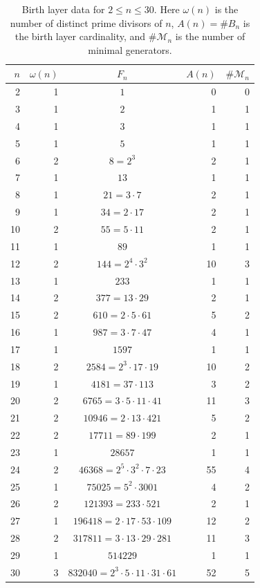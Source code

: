 \begin{table}[ht]
\centering
\small
\caption{Birth layer data for $2 \le n \le 30$. Here $\omega(n)$ is the number of distinct prime divisors of $n$, $A(n)=\#B_n$ is the birth layer cardinality, and $\#\mathcal{M}_n$ is the number of minimal generators.}
\label{tab:birth-layer-data}
\begin{tabular}{rrcrr}
\toprule
$n$ & $\omega(n)$ & $F_n$ & $A(n)$ & $\#\mathcal{M}_n$ \\
\midrule
  2 & 1 & $1$ & 0 & 0 \\
  3 & 1 & $2$ & 1 & 1 \\
  4 & 1 & $3$ & 1 & 1 \\
  5 & 1 & $5$ & 1 & 1 \\
  6 & 2 & $8 = 2^{3}$ & 2 & 1 \\
  7 & 1 & $13$ & 1 & 1 \\
  8 & 1 & $21 = 3 \cdot 7$ & 2 & 1 \\
  9 & 1 & $34 = 2 \cdot 17$ & 2 & 1 \\
  10 & 2 & $55 = 5 \cdot 11$ & 2 & 1 \\
  11 & 1 & $89$ & 1 & 1 \\
  12 & 2 & $144 = 2^{4} \cdot 3^{2}$ & 10 & 3 \\
  13 & 1 & $233$ & 1 & 1 \\
  14 & 2 & $377 = 13 \cdot 29$ & 2 & 1 \\
  15 & 2 & $610 = 2 \cdot 5 \cdot 61$ & 5 & 2 \\
  16 & 1 & $987 = 3 \cdot 7 \cdot 47$ & 4 & 1 \\
  17 & 1 & $1597$ & 1 & 1 \\
  18 & 2 & $2584 = 2^{3} \cdot 17 \cdot 19$ & 10 & 2 \\
  19 & 1 & $4181 = 37 \cdot 113$ & 3 & 2 \\
  20 & 2 & $6765 = 3 \cdot 5 \cdot 11 \cdot 41$ & 11 & 3 \\
  21 & 2 & $10946 = 2 \cdot 13 \cdot 421$ & 5 & 2 \\
  22 & 2 & $17711 = 89 \cdot 199$ & 2 & 1 \\
  23 & 1 & $28657$ & 1 & 1 \\
  24 & 2 & $46368 = 2^{5} \cdot 3^{2} \cdot 7 \cdot 23$ & 55 & 4 \\
  25 & 1 & $75025 = 5^{2} \cdot 3001$ & 4 & 2 \\
  26 & 2 & $121393 = 233 \cdot 521$ & 2 & 1 \\
  27 & 1 & $196418 = 2 \cdot 17 \cdot 53 \cdot 109$ & 12 & 2 \\
  28 & 2 & $317811 = 3 \cdot 13 \cdot 29 \cdot 281$ & 11 & 3 \\
  29 & 1 & $514229$ & 1 & 1 \\
  30 & 3 & $832040 = 2^{3} \cdot 5 \cdot 11 \cdot 31 \cdot 61$ & 52 & 5 \\
\bottomrule
\end{tabular}
\end{table}